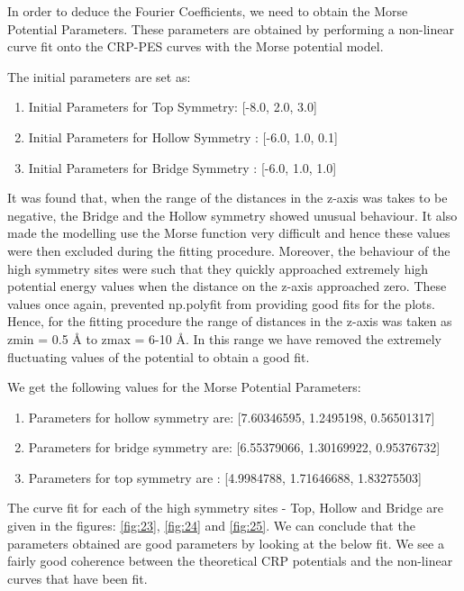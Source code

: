 \documentclass[12pt]{article}
\begin{document}
\vspace{5mm}
In order to deduce the Fourier Coefficients, we need to obtain the Morse Potential Parameters. These parameters are obtained by performing a non-linear curve fit onto the CRP-PES curves with the Morse potential model. 

The initial parameters are set as:

\begin{enumerate}
    \item Initial Parameters for Top Symmetry\hspace{7mm}: [-8.0, 2.0, 3.0]
    \item Initial Parameters for Hollow Symmetry  : [-6.0, 1.0, 0.1]
    \item Initial Parameters for Bridge Symmetry\hspace{1.5mm}  : [-6.0, 1.0, 1.0]
\end{enumerate}
\vspace{5mm}

It was found that, when the range of the distances in the z-axis was takes to be negative, the Bridge and the Hollow symmetry showed unusual behaviour. It also made the modelling use the Morse function very difficult and hence these values were then excluded during the fitting procedure. Moreover, the behaviour of the high symmetry sites were such that they quickly approached extremely high potential energy values when the distance on the z-axis approached zero. These values once again, prevented np.polyfit from providing good fits for the plots. Hence, for the fitting procedure the range of distances in the z-axis was taken as zmin = 0.5 \AA \hspace{0.5mm} to zmax = 6-10 \AA. In this range we have removed the extremely fluctuating values of the potential to obtain a good fit.

\vspace{5mm}

We get the following values for the Morse Potential Parameters:

\begin{enumerate}
    \item Parameters for hollow symmetry are:  [7.60346595, 1.2495198,  0.56501317]
    \item Parameters for bridge symmetry are:  [6.55379066, 1.30169922, 0.95376732]
    \item Parameters for top symmetry are \hspace{4mm}: [4.9984788,  1.71646688, 1.83275503]
\end{enumerate}
\vspace{5mm}
The curve fit for each of the high symmetry sites - Top, Hollow and Bridge are given in the figures: \ref{fig:23}, \ref{fig:24} and \ref{fig:25}. We can conclude that the parameters obtained are good parameters by looking at the below fit. We see a fairly good coherence between the theoretical CRP potentials and the non-linear curves that have been fit.
\vspace{5mm}
\end{document}
